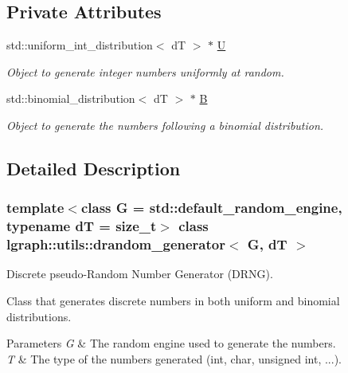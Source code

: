 \subsection*{Private Attributes}
\begin{DoxyCompactItemize}
\item 
\mbox{\label{classlgraph_1_1utils_1_1drandom__generator_a995de3b90cefebba7aa0d93a7900bebb}} 
std\+::uniform\+\_\+int\+\_\+distribution$<$ dT $>$ $\ast$ \hyperlink{classlgraph_1_1utils_1_1drandom__generator_a995de3b90cefebba7aa0d93a7900bebb}{U}
\begin{DoxyCompactList}\small\item\em Object to generate integer numbers uniformly at random. \end{DoxyCompactList}\item 
\mbox{\label{classlgraph_1_1utils_1_1drandom__generator_abf2a3acb2bdee25e7fef80d465d69c97}} 
std\+::binomial\+\_\+distribution$<$ dT $>$ $\ast$ \hyperlink{classlgraph_1_1utils_1_1drandom__generator_abf2a3acb2bdee25e7fef80d465d69c97}{B}
\begin{DoxyCompactList}\small\item\em Object to generate the numbers following a binomial distribution. \end{DoxyCompactList}\end{DoxyCompactItemize}


\subsection{Detailed Description}
\subsubsection*{template$<$class G = std\+::default\+\_\+random\+\_\+engine, typename dT = size\+\_\+t$>$\newline
class lgraph\+::utils\+::drandom\+\_\+generator$<$ G, d\+T $>$}

Discrete pseudo-\/\+Random Number Generator (D\+R\+NG). 

Class that generates discrete numbers in both uniform and binomial distributions.


\begin{DoxyParams}{Parameters}
{\em G} & The random engine used to generate the numbers. \\
\hline
{\em T} & The type of the numbers generated (int, char, unsigned int, ...). \\
\hline
\end{DoxyParams}



